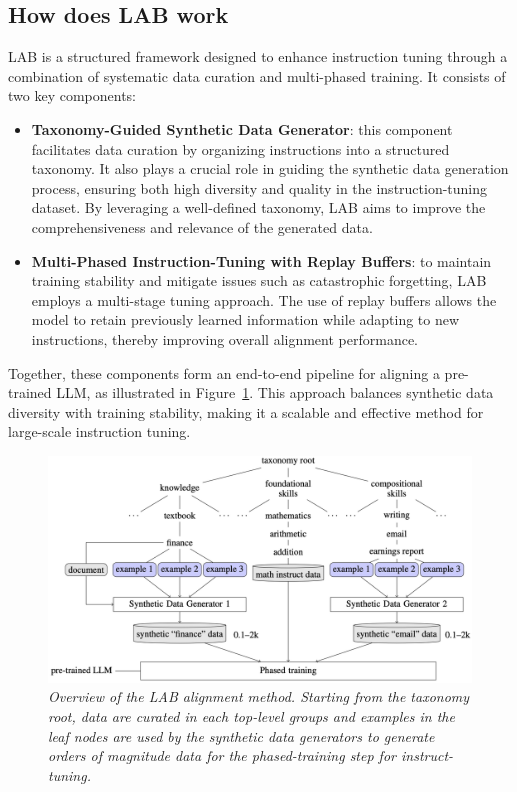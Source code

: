 \documentclass[12pt]{article}
\begin{document}
\subsection{How does LAB work}
LAB is a structured framework designed to enhance instruction tuning through a combination of systematic data curation and multi-phased training. It consists of two key components:
\begin{itemize}
    \item \textbf{Taxonomy-Guided Synthetic Data Generator}: this component facilitates data curation by organizing instructions into a structured taxonomy. It also plays a crucial role in guiding the synthetic data generation process, ensuring both high diversity and quality in the instruction-tuning dataset. By leveraging a well-defined taxonomy, LAB aims to improve the comprehensiveness and relevance of the generated data.
    \item \textbf{Multi-Phased Instruction-Tuning with Replay Buffers}: to maintain training stability and mitigate issues such as catastrophic forgetting, LAB employs a multi-stage tuning approach. The use of replay buffers allows the model to retain previously learned information while adapting to new instructions, thereby improving overall alignment performance.
\end{itemize}
Together, these components form an end-to-end pipeline for aligning a pre-trained LLM, as illustrated in Figure~\ref{fig:ilab}. This approach balances synthetic data diversity with training stability, making it a scalable and effective method for large-scale instruction tuning.\\
\begin{figure}
    \centering
    \includegraphics[width=1\textwidth]{img/figure1.png}
    \caption{\textit{Overview of the LAB alignment method. Starting from the taxonomy root, data are curated in each top-level groups and examples in the leaf nodes are used by the synthetic data generators to generate orders of magnitude data for the phased-training step for instruct-tuning.}}
    \label{fig:ilab}
\end{figure}
\end{document}
